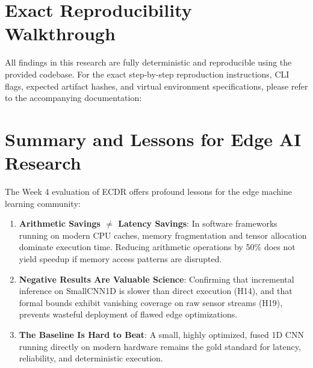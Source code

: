 \documentclass[11pt,article]{article}
\theoremstyle{definition}
\begin{document}
\section{Exact Reproducibility Walkthrough}

All findings in this research are fully deterministic and reproducible using the provided codebase.
For the exact step-by-step reproduction instructions, CLI flags, expected artifact hashes, and virtual environment specifications, please refer to the accompanying documentation:
\begin{center}
\end{center}

\section{Summary and Lessons for Edge AI Research}

The Week 4 evaluation of ECDR offers profound lessons for the edge machine learning community:
\begin{enumerate}
    \item \textbf{Arithmetic Savings $\neq$ Latency Savings}: In software frameworks running on modern CPU caches, memory fragmentation and tensor allocation dominate execution time. Reducing arithmetic operations by 50\% does not yield speedup if memory access patterns are disrupted.
    \item \textbf{Negative Results Are Valuable Science}: Confirming that incremental inference on SmallCNN1D is slower than direct execution (H14), and that formal bounds exhibit vanishing coverage on raw sensor streams (H19), prevents wasteful deployment of flawed edge optimizations.
    \item \textbf{The Baseline Is Hard to Beat}: A small, highly optimized, fused 1D CNN running directly on modern hardware remains the gold standard for latency, reliability, and deterministic execution.
\end{enumerate}
\end{document}
